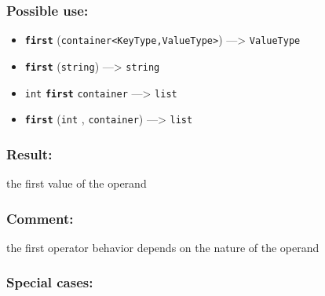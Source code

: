 \documentclass[]{book}
\providecommand{\tightlist}{%
  \setlength{\itemsep}{0pt}\setlength{\parskip}{0pt}}
\theoremstyle{definition}
\theoremstyle{definition}
\theoremstyle{definition}
\theoremstyle{remark}
\begin{document}
\subsubsection{Possible use:}\label{possible-use-167}

\begin{itemize}
\tightlist
\item
  \textbf{\texttt{first}}
  (\texttt{container\textless{}KeyType,ValueType\textgreater{}})
  ---\textgreater{} \texttt{ValueType}
\item
  \textbf{\texttt{first}} (\texttt{string}) ---\textgreater{}
  \texttt{string}
\item
  \texttt{int} \textbf{\texttt{first}} \texttt{container}
  ---\textgreater{} \texttt{list}
\item
  \textbf{\texttt{first}} (\texttt{int} , \texttt{container})
  ---\textgreater{} \texttt{list}
\end{itemize}

\subsubsection{Result:}\label{result-161}

the first value of the operand

\subsubsection{Comment:}\label{comment-37}

the first operator behavior depends on the nature of the operand

\subsubsection{Special cases:}\label{special-cases-61}
\end{document}
